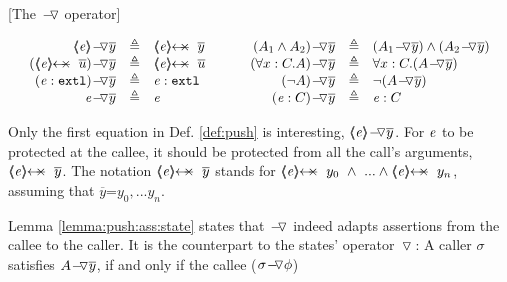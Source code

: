 \begin{definition}
\label{def:push}
[The $\FIXSymbolA$  operator]  

$
\begin{array}{c}
\begin{array}{l}
\begin{array}{rclcrcl}
  \PushAS y {\inside \re} & \triangleq &  \protectedFrom \re {\overline {y} }
  & \ \ \  \ &
  \PushAS y   {(A_1  \wedge  A_2)} & \triangleq &  (\PushAS y  { A_1})  \wedge  ( \PushAS y  {A_2} )  
\\ 
 \PushAS y {(\protectedFrom \re {\overline {u}})} &  \triangleq& \protectedFrom \re {\overline {u}} 
  & &
 \PushAS y  {(\forall x:C.A)} & \triangleq & \forall x:C.({\PushAS y A} )  
  \\  
  \PushAS y  {(\external \re)} &  \triangleq & {\external \re}  %
  & & 
  \PushAS y  {(\neg A)} &  \triangleq & \neg( {\PushAS y A} )  
    \\
     \PushAS y  {\re} &  \triangleq&   \re %
    & &
    \PushAS y  {(\re:C)} &  \triangleq&   \re:C 
 \end{array}
\end{array}
\end{array}
$
\label{f:Push}
\end{definition}

Only the first equation in  Def.  \ref{def:push}  is interesting,
  $\PushAS y {\inside \re}$.  
For $\re$ to be {protected at  the} callee, it should be protected from all the call's arguments,
\ie  $\protectedFrom {\re} {\overline {y}}$. 
The notation $\protectedFrom {\re} {\overline {y}}$   stands for $\protectedFrom \re {y_0}\  \wedge\  ...  \wedge \protectedFrom \re {y_n}$, assuming that $\overline y$=${y_0, ... y_n}$.

Lemma \ref{lemma:push:ass:state}  states that  $\FIXSymbolA$ indeed adapts assertions from the callee to the caller.
It is the counterpart to the states' operator $\pushSymbol$:
A caller   $\sigma$ satisfies  $\PushAS y A$, if and only if the callee   ($\PushASLong {\phi} {\sigma}$) 

